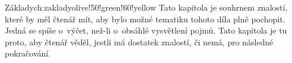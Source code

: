 \begin{chapterintro}{Základy}{ch:zaklady}{olive!50!green!60!yellow}{}
    Tato kapitola je souhrnem znalostí, které by měl čtenář mít, aby bylo možné
    tematiku tohoto díla plně pochopit.
    Jedná se spíše o~výčet, než-li o~obsáhlé vysvětlení pojmů.
    Tato kapitola je tu proto, aby čtenář věděl, jestli má dostatek znalostí,
    či nemá, pro následné pokračování.
\end{chapterintro}


